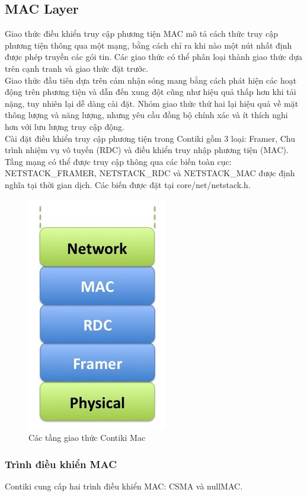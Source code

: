 \documentclass{report}
\begin{document}
\subsection{MAC Layer}
Giao thức điều khiển truy cập phương tiện MAC mô tả cách thức truy cập phương
tiện thông qua một mạng, bằng cách chỉ ra khi nào một nút nhất định được phép
truyền các gói tin. Các giao thức có thể phân loại thành giao thức dựa trên cạnh
tranh và giao thức đặt trước. \\

Giao thức đầu tiên dựa trên cảm nhận sóng mang bằng cách phát hiện các hoạt động
trên phương tiện và dẫn đến xung đột cũng như hiệu quả thấp hơn khi tải nặng, tuy
nhiên lại dễ dàng cài đặt. Nhóm giao thức thứ hai lại hiệu quả về mặt thông lượng
và năng lượng, nhưng yêu cầu đồng bộ chính xác và ít thích nghi hơn với lưu lượng
truy cập động. \\

Cài đặt điều khiển truy cập phương tiện trong Contiki gồm 3 loại: Framer, Chu trình
nhiệm vụ vô tuyến (RDC) và điều khiển truy nhập phương tiện (MAC). Tầng mạng
có thể được truy cập thông qua các biến toàn cục: NETSTACK\_FRAMER,
NETSTACK\_RDC và NETSTACK\_MAC được định nghĩa tại thời gian dịch. Các
biến được đặt tại core/net/netstack.h.
\begin{figure}[h]
	\centering
	\includegraphics[scale = 0.7]{fig30.png}
	\caption{Các tầng giao thức Contiki Mac}
	\label{fig:Graph30}
\end{figure}
\subsubsection{Trình điều khiển MAC}
Contiki cung cấp hai trình điều khiển MAC: CSMA và nullMAC. \\
\end{document}
